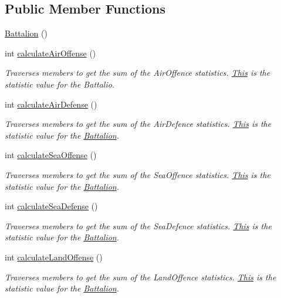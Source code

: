 \subsection*{Public Member Functions}
\begin{DoxyCompactItemize}
\item 
\mbox{\hyperlink{class_battalion_a0df462bc8953b18b85f418715f6afa90}{Battalion}} ()
\item 
int \mbox{\hyperlink{class_battalion_ae3489e11413500aa1c1878f0651bebdc}{calculate\+Air\+Offense}} ()
\begin{DoxyCompactList}\small\item\em Traverses members to get the sum of the Air\+Offence statistics. \mbox{\hyperlink{class_this}{This}} is the statistic value for the Battalio. \end{DoxyCompactList}\item 
int \mbox{\hyperlink{class_battalion_aa7e5340aa0d4547fcc7a4ecfd4fb31cb}{calculate\+Air\+Defense}} ()
\begin{DoxyCompactList}\small\item\em Traverses members to get the sum of the Air\+Defence statistics. \mbox{\hyperlink{class_this}{This}} is the statistic value for the \mbox{\hyperlink{class_battalion}{Battalion}}. \end{DoxyCompactList}\item 
int \mbox{\hyperlink{class_battalion_a589de99d9bcb79da2bd43303f272d079}{calculate\+Sea\+Offense}} ()
\begin{DoxyCompactList}\small\item\em Traverses members to get the sum of the Sea\+Offence statistics. \mbox{\hyperlink{class_this}{This}} is the statistic value for the \mbox{\hyperlink{class_battalion}{Battalion}}. \end{DoxyCompactList}\item 
int \mbox{\hyperlink{class_battalion_a85b6a7096cce8ade372f1320bdc5949a}{calculate\+Sea\+Defense}} ()
\begin{DoxyCompactList}\small\item\em Traverses members to get the sum of the Sea\+Defence statistics. \mbox{\hyperlink{class_this}{This}} is the statistic value for the \mbox{\hyperlink{class_battalion}{Battalion}}. \end{DoxyCompactList}\item 
int \mbox{\hyperlink{class_battalion_a4b7a80080e4333259679e8b2cb522ae9}{calculate\+Land\+Offense}} ()
\begin{DoxyCompactList}\small\item\em Traverses members to get the sum of the Land\+Offence statistics. \mbox{\hyperlink{class_this}{This}} is the statistic value for the \mbox{\hyperlink{class_battalion}{Battalion}}. \end{DoxyCompactList}\item 

\end{DoxyCompactItemize}
